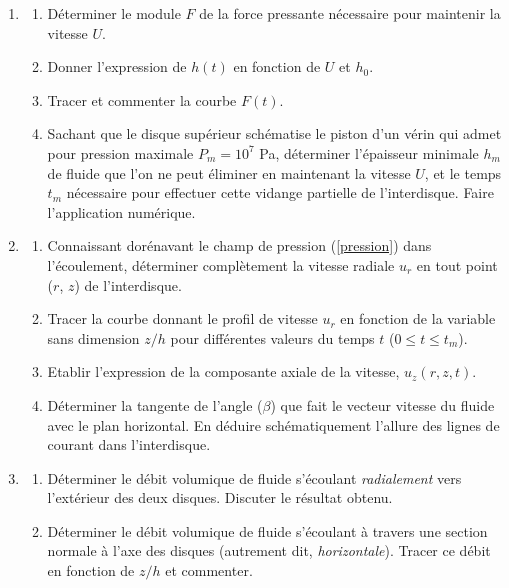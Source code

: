 \begin{enumerate}
\begin{enumerate}
    $\partial p/\partial r$ et $\partial^2 p/\partial r^2$.
  \item 
    A l'aide des conditions aux limites sur $u_z$ en $z=0$ et $z = h(t)$, 
    en d\'eduire l'\'equation diff\'erentielle que doit v\'erifier $p$.
  \item 
    Montrer alors que la pression au sein du fluide a pour expression :
    \begin{equation}
      p(r, t) = P_a + \frac{3\mu U}{h(t)^3} (R^2 - r^2).
      \label{pression}
    \end{equation}
  \end{enumerate}
\item
  \begin{enumerate}
  \item 
    D\'eterminer le module $F$ de la force pressante n\'ecessaire pour maintenir
    la vitesse $U$.
  \item 
    Donner l'expression de $h(t)$ en fonction de $U$ et $h_0$.
  \item 
    Tracer et commenter la courbe $F(t)$.
  \item 
    Sachant que le disque sup\'erieur sch\'ematise le piston d'un v\'erin qui admet
    pour pression maximale $P_m = 10^7$ Pa, d\'eterminer l'\'epaisseur minimale
    $h_m$ de fluide que l'on ne peut \'eliminer en maintenant la vitesse $U$, et le temps 
    $t_m$ n\'ecessaire pour effectuer cette vidange partielle de l'interdisque. 
    Faire l'application num\'erique.
  \end{enumerate}
\item
  \begin{enumerate}
  \item 
    Connaissant dor\'enavant le champ de pression (\ref{pression}) dans l'\'ecoulement, 
    d\'eterminer compl\`etement la vitesse radiale $u_r$ en tout point
    ($r$, $z$) de l'interdisque.
  \item
    Tracer la courbe donnant le profil de vitesse $u_r$ en fonction de la variable
    sans dimension $z/h$ pour diff\'erentes valeurs du temps $t$
    ($0 \leq t \leq t_m$).
  \item
    Etablir l'expression de la composante axiale de la vitesse, $u_z(r, z, t)$.
  \item
    D\'eterminer la tangente de l'angle ($\beta$) que fait le vecteur vitesse
    du fluide avec le plan  horizontal.
    En d\'eduire sch\'ematiquement l'allure des lignes de courant dans
    l'interdisque.
  \end{enumerate}
\item
  \begin{enumerate}
  \item 
    D\'eterminer le d\'ebit volumique de fluide s'\'ecoulant \textit{radialement}
    vers l'ext\'erieur des deux disques. Discuter le r\'esultat obtenu.
  \item 
    D\'eterminer le d\'ebit volumique de fluide s'\'ecoulant \`a travers une
    section normale \`a l'axe des disques (autrement dit, \textit{horizontale}).
    Tracer ce d\'ebit en fonction de $z/h$ et commenter.
  \end{enumerate}
\end{enumerate}



